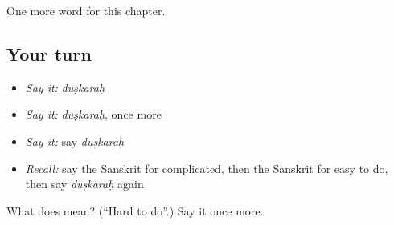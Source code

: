 \begin{grammarlens}[title={What you've built}]
One more word for this chapter.
\end{grammarlens}

\subsection*{Your turn}
\begin{itemize}
\raggedright
  \item \emph{Say it:} \emph{duṣkaraḥ}
  \item \emph{Say it:} \emph{duṣkaraḥ}, once more
  \item \emph{Say it:} say \emph{duṣkaraḥ}
  \item \emph{Recall:} say the Sanskrit for complicated, then the Sanskrit for easy to do, then say \emph{duṣkaraḥ} again
\end{itemize}

\begin{tcolorbox}[breakable,colback=teal!4,colframe=teal!35!black,title={Before you move on}]
What does  mean? (\textquotedblleft{}Hard to do\textquotedblright{}.) Say it once more.
\end{tcolorbox}
